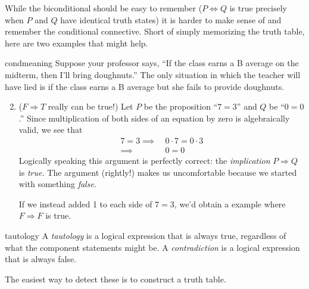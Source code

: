 
While the biconditional should be easy to remember ($P\Longleftrightarrow Q$ is true precisely when $P$ and $Q$ have identical truth states) it is harder to make sense of and remember the conditional connective. Short of simply memorizing the truth table, here are two examples that might help.

\begin{examples}{}{condmeaning}
	\exstart Suppose your professor says, ``If the class earns a B average on the midterm, then I'll bring doughnuts.'' The only situation in which the teacher will have lied is if the class earns a B average but she fails to provide doughnuts.
	\begin{enumerate}\setcounter{enumi}{1}
	  \item ($F\Longrightarrow T$ really can be true!) Let $P$ be the proposition ``$7=3$'' and $Q$ be ``$0=0$.'' Since multiplication of both sides of an equation by zero is algebraically valid, we see that
	  \begin{align*}
			7=3\implies\ &0\cdot 7=0\cdot 3\tag*{(If $7=3$, then 0 times 7 equals 0 times 3)}\\
			\implies\ &0=0\tag*{(then 0 equals 0)}
		\end{align*}
	  Logically speaking this argument is perfectly correct: the \emph{implication} $P\Longrightarrow Q$ is \emph{true.} The argument (rightly!) makes us uncomfortable because we started with something \emph{false.}\par
	  If we instead added 1 to each side of $7=3$, we'd obtain a example where $F\Longrightarrow F$ is true.
	\end{enumerate}
\end{examples}





\begin{defn}{}{tautology}
	A \emph{tautology} is a logical expression that is always true, regardless of what the component statements might be.\smallbreak
	A \emph{contradiction} is a logical expression that is always false.
\end{defn}

The easiest way to detect these is to construct a truth table.

